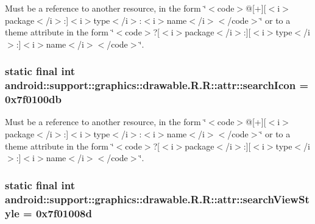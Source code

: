 Must be a reference to another resource, in the form \char`\"{}$<$code$>$@\mbox{[}+\mbox{]}\mbox{[}$<$i$>$package$<$/i$>$:\mbox{]}$<$i$>$type$<$/i$>$:$<$i$>$name$<$/i$>$$<$/code$>$\char`\"{} or to a theme attribute in the form \char`\"{}$<$code$>$?\mbox{[}$<$i$>$package$<$/i$>$:\mbox{]}\mbox{[}$<$i$>$type$<$/i$>$:\mbox{]}$<$i$>$name$<$/i$>$$<$/code$>$\char`\"{}. \hypertarget{classandroid_1_1support_1_1graphics_1_1drawable_1_1_r_1_1attr_378ec4d1e058befd29e9da0921d9f8d6}{
\subsubsection[{searchIcon}]{\setlength{\rightskip}{0pt plus 5cm}static final int android::support::graphics::drawable.R.R::attr::searchIcon = 0x7f0100db}}
\label{classandroid_1_1support_1_1graphics_1_1drawable_1_1_r_1_1attr_378ec4d1e058befd29e9da0921d9f8d6}


Must be a reference to another resource, in the form \char`\"{}$<$code$>$@\mbox{[}+\mbox{]}\mbox{[}$<$i$>$package$<$/i$>$:\mbox{]}$<$i$>$type$<$/i$>$:$<$i$>$name$<$/i$>$$<$/code$>$\char`\"{} or to a theme attribute in the form \char`\"{}$<$code$>$?\mbox{[}$<$i$>$package$<$/i$>$:\mbox{]}\mbox{[}$<$i$>$type$<$/i$>$:\mbox{]}$<$i$>$name$<$/i$>$$<$/code$>$\char`\"{}. \hypertarget{classandroid_1_1support_1_1graphics_1_1drawable_1_1_r_1_1attr_c99c507399e9cb6fc75fe8905a91e717}{
\subsubsection[{searchViewStyle}]{\setlength{\rightskip}{0pt plus 5cm}static final int android::support::graphics::drawable.R.R::attr::searchViewStyle = 0x7f01008d}}
\label{classandroid_1_1support_1_1graphics_1_1drawable_1_1_r_1_1attr_c99c507399e9cb6fc75fe8905a91e717}


